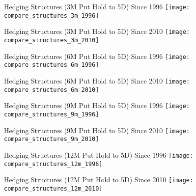 \documentclass{beamer}
\begin{document}
\begin{frame}{Hedging Structures (3M Put Hold to 5D) Since 1996}
\texttt{[image: compare\_structures\_3m\_1996]}
\end{frame}
\begin{frame}{Hedging Structures (3M Put Hold to 5D) Since 2010}
\texttt{[image: compare\_structures\_3m\_2010]}
\end{frame}

\begin{frame}{Hedging Structures (6M Put Hold to 5D) Since 1996}
\texttt{[image: compare\_structures\_6m\_1996]}
\end{frame}
\begin{frame}{Hedging Structures (6M Put Hold to 5D) Since 2010}
\texttt{[image: compare\_structures\_6m\_2010]}
\end{frame}

\begin{frame}{Hedging Structures (9M Put Hold to 5D) Since 1996}
\texttt{[image: compare\_structures\_9m\_1996]}
\end{frame}
\begin{frame}{Hedging Structures (9M Put Hold to 5D) Since 2010}
\texttt{[image: compare\_structures\_9m\_2010]}
\end{frame}

\begin{frame}{Hedging Structures (12M Put Hold to 5D) Since 1996}
\texttt{[image: compare\_structures\_12m\_1996]}
\end{frame}
\begin{frame}{Hedging Structures (12M Put Hold to 5D) Since 2010}
\texttt{[image: compare\_structures\_12m\_2010]}
\end{frame}

\end{document}
